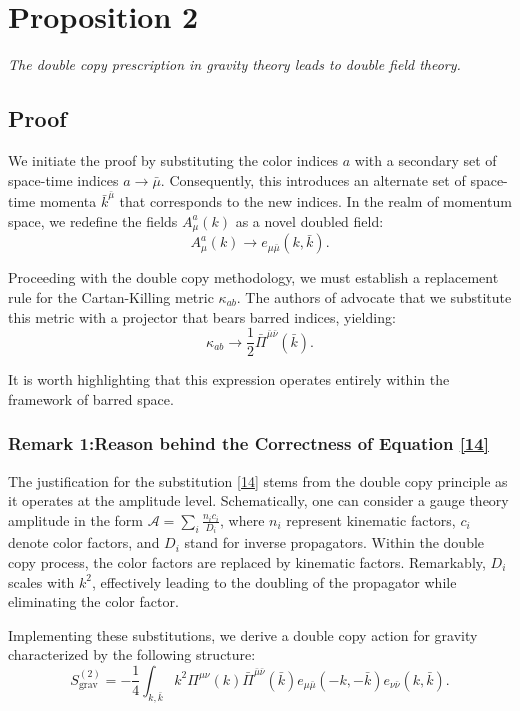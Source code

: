 \documentclass[13pt]{article}
\begin{document}
\section*{Proposition 2}
\textit{The double copy prescription in gravity theory leads to double field theory.}

\subsection*{Proof}
We initiate the proof by substituting the color indices $a$ with a secondary set of space-time indices $a \rightarrow \bar{\mu}$. Consequently, this introduces an alternate set of space-time momenta $\bar{k}^{\bar{\mu}}$ that corresponds to the new indices. In the realm of momentum space, we redefine the fields $A^a_{\mu}(k)$ as a novel doubled field:
\begin{equation}
A^a_{\mu}(k) \rightarrow e_{\mu \bar{\mu}}(k, \bar{k}). 
\tag{17}
\end{equation}

Proceeding with the double copy methodology, we must establish a replacement rule for the Cartan-Killing metric $\kappa_{ab}$. The authors of \cite{D_az_Jaramillo_2022} advocate that we substitute this metric with a projector that bears barred indices, yielding:
\begin{equation}
\kappa_{ab} \rightarrow \frac{1}{2} \bar{\Pi}^{\bar{\mu} \bar{\nu}}(\bar{k}). \tag{18}
\end{equation}

It is worth highlighting that this expression operates entirely within the framework of barred space.

\subsubsection*{Remark 1:Reason behind the Correctness of Equation \eqref{14}}
The justification for the substitution \eqref{14} stems from the double copy principle as it operates at the amplitude level. Schematically, one can consider a gauge theory amplitude in the form $\mathcal{A} = \sum_i \frac{n_i c_i}{D_i}$, where $n_i$ represent kinematic factors, $c_i$ denote color factors, and $D_i$ stand for inverse propagators. Within the double copy process, the color factors are replaced by kinematic factors. Remarkably, $D_i$ scales with $k^2$, effectively leading to the doubling of the propagator while eliminating the color factor.

Implementing these substitutions, we derive a double copy action for gravity characterized by the following structure:
\begin{equation}
S_{\text{grav}}^{(2)} = - \frac{1}{4} \int_{k, \bar{k}} k^2 \Pi^{\mu \nu}(k) \bar{\Pi}^{\bar{\mu}\bar{\nu}}(\bar{k}) e_{\mu \bar{\mu}}(-k, -\bar{k})e_{\nu \bar{\nu}}(k, \bar{k}). \tag{19}
\end{equation}
\end{document}
